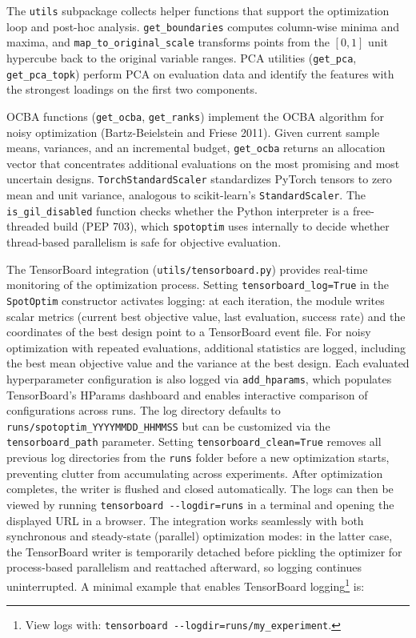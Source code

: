 \documentclass[
  twocolumn]{article}
\begin{document}
The \texttt{utils} subpackage collects helper functions that support the
optimization loop and post-hoc analysis. \texttt{get\_boundaries}
computes column-wise minima and maxima, and
\texttt{map\_to\_original\_scale} transforms points from the \([0, 1]\)
unit hypercube back to the original variable ranges. PCA utilities
(\texttt{get\_pca}, \texttt{get\_pca\_topk}) perform PCA on evaluation
data and identify the features with the strongest loadings on the first
two components.

OCBA functions (\texttt{get\_ocba}, \texttt{get\_ranks}) implement the
OCBA algorithm for noisy optimization (Bartz-Beielstein and Friese
2011). Given current sample means, variances, and an incremental budget,
\texttt{get\_ocba} returns an allocation vector that concentrates
additional evaluations on the most promising and most uncertain designs.
\texttt{TorchStandardScaler} standardizes PyTorch tensors to zero mean
and unit variance, analogous to scikit-learn's \texttt{StandardScaler}.
The \texttt{is\_gil\_disabled} function checks whether the Python
interpreter is a free-threaded build (PEP 703), which \texttt{spotoptim}
uses internally to decide whether thread-based parallelism is safe for
objective evaluation.

The TensorBoard integration (\texttt{utils/tensorboard.py}) provides
real-time monitoring of the optimization process. Setting
\texttt{tensorboard\_log=True} in the \texttt{SpotOptim} constructor
activates logging: at each iteration, the module writes scalar metrics
(current best objective value, last evaluation, success rate) and the
coordinates of the best design point to a TensorBoard event file. For
noisy optimization with repeated evaluations, additional statistics are
logged, including the best mean objective value and the variance at the
best design. Each evaluated hyperparameter configuration is also logged
via \texttt{add\_hparams}, which populates TensorBoard's HParams
dashboard and enables interactive comparison of configurations across
runs. The log directory defaults to
\texttt{runs/spotoptim\_YYYYMMDD\_HHMMSS} but can be customized via the
\texttt{tensorboard\_path} parameter. Setting
\texttt{tensorboard\_clean=True} removes all previous log directories
from the \texttt{runs} folder before a new optimization starts,
preventing clutter from accumulating across experiments. After
optimization completes, the writer is flushed and closed automatically.
The logs can then be viewed by running
\texttt{tensorboard\ -\/-logdir=runs} in a terminal and opening the
displayed URL in a browser. The integration works seamlessly with both
synchronous and steady-state (parallel) optimization modes: in the
latter case, the TensorBoard writer is temporarily detached before
pickling the optimizer for process-based parallelism and reattached
afterward, so logging continues uninterrupted. A minimal example that
enables TensorBoard logging\footnote{ View logs with:
  \texttt{tensorboard\ -\/-logdir=runs/my\_experiment}.} is:
\end{document}
